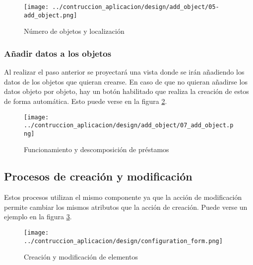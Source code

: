 \begin{figure}[ht]
    \centering
    \texttt{[image: ../contruccion\_aplicacion/design/add\_object/05-add\_object.png]}
    \caption{Número de objetos y localización}\label{fig:4-creation-o}
\end{figure}

\subsubsection{Añadir datos a los objetos}
Al realizar el paso anterior se proyectará una vista donde se irán añadiendo los datos de los objetos que quieran crearse. En caso de que no quieran añadirse los datos objeto por objeto, hay un botón habilitado que realiza la creación de estos de forma automática. Esto puede verse en la figura \ref{fig:5-creation-o}.
\begin{figure}[ht]
    \centering
    \texttt{[image: ../contruccion\_aplicacion/design/add\_object/07\_add\_object.png]}
    \caption{Funcionamiento y descomposición de préstamos}\label{fig:5-creation-o}
\end{figure}

\subsection{Procesos de creación y modificación}
Estos procesos utilizan el mismo componente ya que la acción de modificación permite cambiar los mismos atributos que la acción de creación. Puede verse un ejemplo en la figura \ref{fig:creation-and-modification}.
\begin{figure}[ht]
    \centering
    \texttt{[image: ../contruccion\_aplicacion/design/configuration\_form.png]}
    \caption{Creación y modificación de elementos}\label{fig:creation-and-modification}
\end{figure}
